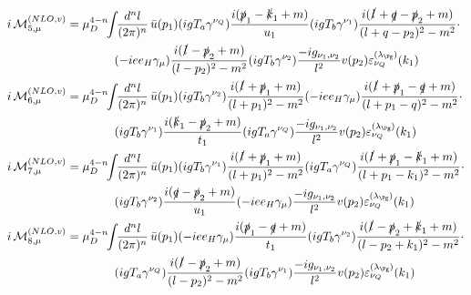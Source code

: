 \begin{align}
i\Md^{(NLO,v)}_{5,\mu} &=\mu_D^{4-n}\!\!\int\!\!\frac{d^nl}{(2\pi)^n}\,\bar u(p_1)(igT_a\gamma^{\nu_Q})\frac{i(\slashed{p}_1-\slashed{k}_1+m)}{u_1}(igT_b\gamma^{\nu_1})\frac{i(\slashed{l}+\slashed{q}-\slashed{p}_2+m)}{(l+q-p_2)^2-m^2}\cdot\nonumber\\
 &\hspace{40pt}(-i e e_H \gamma_\mu)\frac{i(\slashed{l}-\slashed{p}_2+m)}{(l-p_2)^2-m^2}(igT_b\gamma^{\nu_2})\frac{-ig_{\nu_1,\nu_2}}{l^2}v(p_2)\varepsilon^{(\lambda_{\Pg})}_{\nu_Q}(k_1)\\
i\Md^{(NLO,v)}_{6,\mu} &=\mu_D^{4-n}\!\!\int\!\!\frac{d^nl}{(2\pi)^n}\,\bar u(p_1)(igT_b\gamma^{\nu_2})\frac{i(\slashed{l}+\slashed{p}_1+m)}{(l+p_1)^2-m^2}(-i e e_H \gamma_\mu)\frac{i(\slashed{l}+\slashed{p}_1-\slashed{q}+m)}{(l+p_1-q)^2-m^2}\cdot\nonumber\\
 &\hspace{40pt}(igT_b\gamma^{\nu_1})\frac{i(\slashed{k}_1-\slashed{p}_2+m)}{t_1}(igT_a\gamma^{\nu_Q})\frac{-ig_{\nu_1,\nu_2}}{l^2}v(p_2)\varepsilon^{(\lambda_{\Pg})}_{\nu_Q}(k_1)\\
i\Md^{(NLO,v)}_{7,\mu} &=\mu_D^{4-n}\!\!\int\!\!\frac{d^nl}{(2\pi)^n}\,\bar u(p_1)(igT_b\gamma^{\nu_1})\frac{i(\slashed{l}+\slashed{p}_1+m)}{(l+p_1)^2-m^2}(igT_a\gamma^{\nu_Q})\frac{i(\slashed{l}+\slashed{p}_1-\slashed{k}_1+m)}{(l+p_1-k_1)^2-m^2}\cdot\nonumber\\
 &\hspace{40pt}(igT_b\gamma^{\nu_2})\frac{i(\slashed{q}-\slashed{p}_2+m)}{u_1}(-i e e_H \gamma_\mu)\frac{-ig_{\nu_1,\nu_2}}{l^2}v(p_2)\varepsilon^{(\lambda_{\Pg})}_{\nu_Q}(k_1)\\
i\Md^{(NLO,v)}_{8,\mu} &=\mu_D^{4-n}\!\!\int\!\!\frac{d^nl}{(2\pi)^n}\,\bar u(p_1)(-i e e_H \gamma_\mu)\frac{i(\slashed{p}_1-\slashed{q}+m)}{t_1}(igT_b\gamma^{\nu_2})\frac{i(\slashed{l}-\slashed{p}_2+\slashed{k}_1+m)}{(l-p_2+k_1)^2-m^2}\cdot\nonumber\\
 &\hspace{40pt}(igT_a\gamma^{\nu_Q})\frac{i(\slashed{l}-\slashed{p}_2+m)}{(l-p_2)^2-m^2}(igT_b\gamma^{\nu_1})\frac{-ig_{\nu_1,\nu_2}}{l^2}v(p_2)\varepsilon^{(\lambda_{\Pg})}_{\nu_Q}(k_1)
\end{align}

\pagebreak

